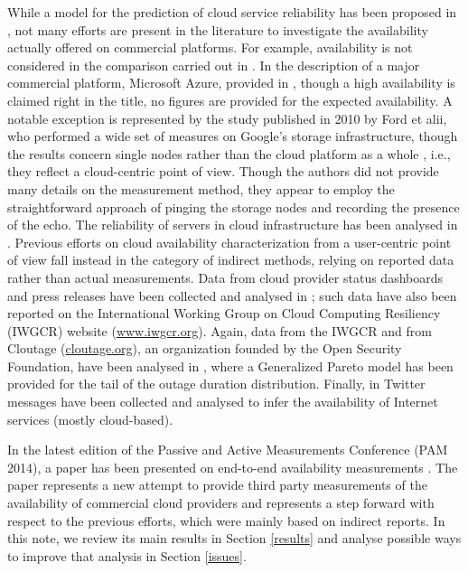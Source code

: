 \documentclass[runningheads,a4paper]{llncs}
\begin{document}
While a model for the prediction of cloud service reliability has been proposed in \cite{dai2009}, not many efforts are present in the literature to investigate the availability actually offered on commercial platforms. For example, availability is not considered in the comparison carried out in \cite{li2010cloudcmp}. In the description of a  major commercial platform, Microsoft Azure, provided in \cite{calder2011windows}, though a high availability is claimed right in the title, no figures are provided for the expected availability. A notable exception is represented by the study published in 2010 by Ford et alii, who performed a wide set of measures on Google's storage infrastructure, though the results concern single nodes rather than the cloud platform as a whole \cite{ford2010}, i.e., they reflect a cloud-centric point of view. Though the authors did not provide many details on the measurement method, they appear to employ the straightforward approach of pinging the storage nodes and recording the presence of the echo. The reliability of servers in cloud infrastructure has been analysed in \cite{vishwanath2010}. Previous efforts on cloud availability characterization from a user-centric point of view fall instead in the category of indirect methods, relying on reported data rather than actual measurements.  Data from cloud provider status dashboards and press releases have been collected and analysed in \cite{IWGCR2013}; such data have also been reported on the International Working Group on Cloud Computing Resiliency (IWGCR) website (\url{www.iwgcr.org}). Again, data from the IWGCR and from Cloutage (\url{cloutage.org}), an organization founded by the Open Security Foundation, have been analysed in \cite{Naldi-DRCN13}, where a Generalized Pareto model has been provided for the tail of the outage duration distribution. Finally, in \cite{Motoyama2010} Twitter messages have been collected and analysed to infer the availability of Internet services (mostly cloud-based).

In the latest edition of the Passive and Active Measurements Conference (PAM 2014), a paper has been presented on end-to-end availability measurements \cite{Hu-PAM2014}. The paper represents a new attempt to provide third party measurements of the availability of commercial cloud providers and represents a step forward with respect to the previous efforts, which were mainly based on indirect reports. In this note, we review its main results in Section \ref{results} and analyse possible ways to improve that analysis in Section \ref{issues}.
\end{document}
